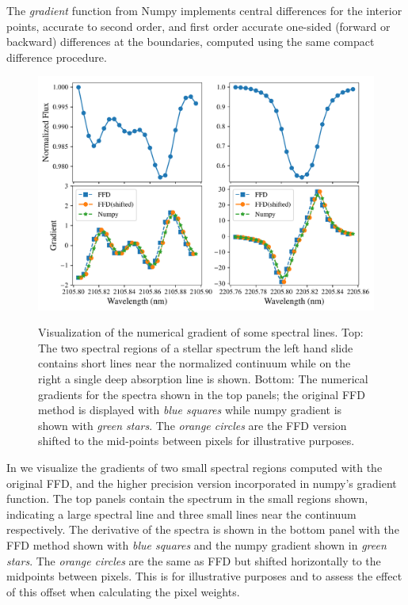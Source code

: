 The \emph{gradient} function from Numpy implements central differences for the interior points, accurate to second order, and first order accurate one-sided (forward or backward) differences at the boundaries, computed using the same compact difference procedure.

\begin{figure}
    \centering
   \includegraphics[width=0.8\linewidth]{figures/information-content/spectral_gradients}\\
    \caption{Visualization of the numerical gradient of some spectral lines. Top: The two spectral regions of a stellar spectrum the left hand slide contains short lines near the normalized continuum while on the right a single deep absorption line is shown. Bottom: The numerical gradients for the spectra shown in the top panels; the original {FFD} method is displayed  with \emph{blue squares} while numpy gradient is shown with \emph{green stars}. The \emph{orange circles} are the {FFD} version shifted to the mid-points between pixels for illustrative purposes.}
    \label{fig:gradients}
\end{figure}




In  we visualize the gradients of two small spectral regions computed with the original {FFD}, and the higher precision version incorporated in numpy's gradient function. 
The top panels contain the spectrum in the small regions shown, indicating a large spectral line and three small lines near the continuum respectively. 
The derivative of the spectra is shown in the bottom panel with the {FFD} method shown with \emph{blue squares} and the numpy gradient shown in \emph{green stars}. 
The \emph{orange circles} are the same as {FFD} but shifted horizontally to the midpoints between  pixels. 
This is for illustrative purposes and to assess the effect of this offset when calculating the pixel weights.

